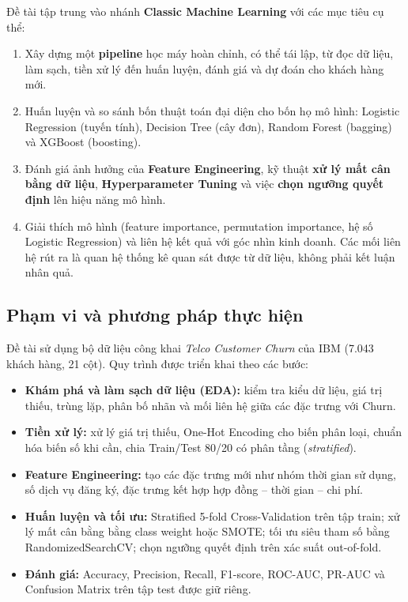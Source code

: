 Đề tài tập trung vào nhánh \textbf{Classic Machine Learning} với các mục tiêu cụ thể:
\begin{enumerate}
    \item Xây dựng một \textbf{pipeline} học máy hoàn chỉnh, có thể tái lập, từ đọc dữ liệu, làm sạch, tiền xử lý đến huấn luyện, đánh giá và dự đoán cho khách hàng mới.
    \item Huấn luyện và so sánh bốn thuật toán đại diện cho bốn họ mô hình: Logistic Regression (tuyến tính), Decision Tree (cây đơn), Random Forest (bagging) và XGBoost (boosting).
    \item Đánh giá ảnh hưởng của \textbf{Feature Engineering}, kỹ thuật \textbf{xử lý mất cân bằng dữ liệu}, \textbf{Hyperparameter Tuning} và việc \textbf{chọn ngưỡng quyết định} lên hiệu năng mô hình.
    \item Giải thích mô hình (feature importance, permutation importance, hệ số Logistic Regression) và liên hệ kết quả với góc nhìn kinh doanh. Các mối liên hệ rút ra là quan hệ thống kê quan sát được từ dữ liệu, không phải kết luận nhân quả.
\end{enumerate}

\subsection{Phạm vi và phương pháp thực hiện}
Đề tài sử dụng bộ dữ liệu công khai \textit{Telco Customer Churn} của IBM (7.043 khách hàng, 21 cột). Quy trình được triển khai theo các bước:
\begin{itemize}
    \item \textbf{Khám phá và làm sạch dữ liệu (EDA):} kiểm tra kiểu dữ liệu, giá trị thiếu, trùng lặp, phân bố nhãn và mối liên hệ giữa các đặc trưng với Churn.
    \item \textbf{Tiền xử lý:} xử lý giá trị thiếu, One-Hot Encoding cho biến phân loại, chuẩn hóa biến số khi cần, chia Train/Test 80/20 có phân tầng (\textit{stratified}).
    \item \textbf{Feature Engineering:} tạo các đặc trưng mới như nhóm thời gian sử dụng, số dịch vụ đăng ký, đặc trưng kết hợp hợp đồng -- thời gian -- chi phí.
    \item \textbf{Huấn luyện và tối ưu:} Stratified 5-fold Cross-Validation trên tập train; xử lý mất cân bằng bằng class weight hoặc SMOTE; tối ưu siêu tham số bằng RandomizedSearchCV; chọn ngưỡng quyết định trên xác suất out-of-fold.
    \item \textbf{Đánh giá:} Accuracy, Precision, Recall, F1-score, ROC-AUC, PR-AUC và Confusion Matrix trên tập test được giữ riêng.
\end{itemize}

